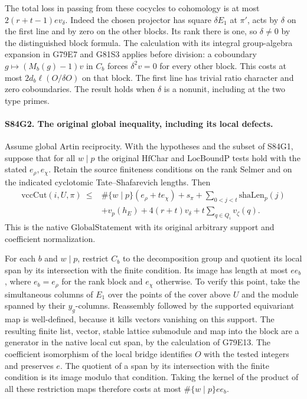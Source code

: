 The total loss in passing from these cocycles to cohomology
is at most $2(r+t-1)e v_\delta$. Indeed the chosen projector
has square $\delta E_1$ at $\pi'$, acts by $\delta$ on the
first line and by zero on the other blocks. Its rank there
is one, so $\delta\ne0$ by the distinguished block formula.
The calculation with its integral group-algebra expansion in
G79E7 and G81S3 applies before division: a coboundary
$g\mapsto(M_b(g)-1)v$ in $C_b$ forces $\delta^2 v=0$ for
every other block. This costs at most $2d_b\ell(O/\delta O)$
on that block. The first line has trivial ratio character
and zero coboundaries. The result holds when $\delta$ is a
nonunit, including at the two type primes.

\paragraph{S84G2. The original global inequality, including its local defects.}
Assume global Artin reciprocity. With the hypotheses and the
subset of S84G1, suppose that for all $w\mid p$ the original
$\mathrm{HfChar}$ and $\mathrm{LocBoundP}$ tests hold with
the stated $e_\rho,e_\chi$. Retain the source finiteness
conditions on the rank Selmer and on the indicated cyclotomic
Tate--Shafarevich lengths. Then
\[
\begin{split}
 \mathrm{vccCut}(i,U,\pi)\ \le{}&
  \#\{w\mid p\}(e_\rho+t e_\chi)+s_\pi
  +\sum_{0<j<t}\mathrm{shaLen}_{p}(j)\\
  &+v_p(h_E)+4(r+t)v_\delta
                        +t\sum_{q\in Q_i}v_\zeta(q).
\end{split}
\]
This is the native $\mathrm{GlobalStatement}$ with its
original arbitrary support and coefficient normalization.

For each $b$ and $w\mid p$, restrict $C_b$ to the decomposition
group and quotient its local span by its intersection with
the finite condition. Its image has length at most
$e e_b$, where $e_b=e_\rho$ for the rank block and $e_\chi$
otherwise. To verify this point, take the simultaneous columns
of $E_1$ over the points of the cover above $U$ and the
module spanned by their $y_g$-columns. Reassembly followed
by the supported equivariant map is well-defined, because it
kills vectors vanishing on this support. The resulting
finite list, vector, stable lattice submodule and map into
the block are a generator in the native local cut span,
by the calculation of G79E13. The coefficient isomorphism
of the local bridge identifies $O$ with the tested integers
and preserves $e$. The quotient of a span by its intersection
with the finite condition is its image modulo that condition.
Taking the kernel of the product of all these restriction
maps therefore costs at most $\#\{w\mid p\}e e_b$.

